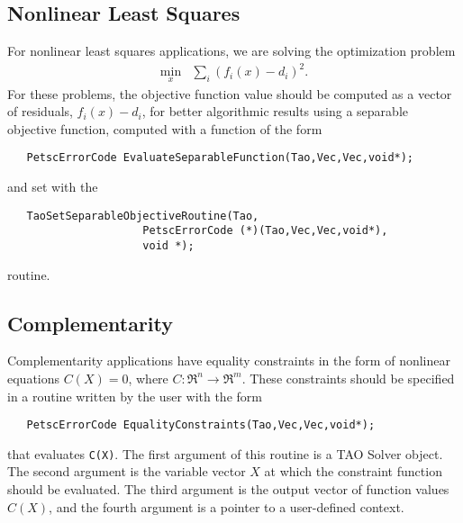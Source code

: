 \subsection{Nonlinear Least Squares}\label{sec:evalsof}
For nonlinear least squares applications, we are solving
the optimization problem
\[
\begin{array}{ll}
\displaystyle \min_{x} & \displaystyle \sum_i (f_i(x) - d_i)^2.
\end{array}
\]
For these problems, the objective function value should be computed as a 
vector of residuals, $f_i(x) - d_i$, for better algorithmic results using 
a separable objective function, computed with a function of the form
\begin{verbatim}
   PetscErrorCode EvaluateSeparableFunction(Tao,Vec,Vec,void*);
\end{verbatim}
and set with the
\begin{verbatim}
   TaoSetSeparableObjectiveRoutine(Tao,
                     PetscErrorCode (*)(Tao,Vec,Vec,void*),
                     void *);
\end{verbatim}
routine.

\begin{comment}
The computation of the Jacobian of the separable objective routine 
should be in a routine that looks like
\begin{verbatim}
   PetscErrorCode EvaluateJacobian(Tao,Vec,Mat,Mat,void*);
\end{verbatim}
This function can be registered with TAO by using the function
\begin{verbatim}
   TaoSetJacobianRoutine(Tao,Mat J, Mat Jpre,
                     PetscErrorCode (*)(Tao,Vec,Mat,Mat,
                     void*), void *);
\end{verbatim}
The first argument is the TAO solver object, the second and third arguments
are the Mat object where the Jacobian will be stored and the Mat object
that will be used for the preconditioning (they may be the same). The
fourth 
argument is the function that evaluates the Jacobian, 
and the fifth argument is a pointer to a user defined context,
cast as a {\tt void*} pointer.
\end{comment}



\subsection{Complementarity}
Complementarity applications have equality constraints in the form of 
nonlinear equations 
$C(X) = 0$, where $C: \Re^n \to \Re^m$.
These constraints should be specified in a 
routine written by the user with the form
\begin{verbatim}
   PetscErrorCode EqualityConstraints(Tao,Vec,Vec,void*);
\end{verbatim}
that evaluates {\tt C(X)}.
\noindent
The first argument of this routine is a TAO Solver object.  The second argument
is the variable vector $X$ at which the constraint function should be 
evaluated.  
The third argument is the output vector of function values $C(X)$, and the fourth
argument is a pointer to a user-defined context.


